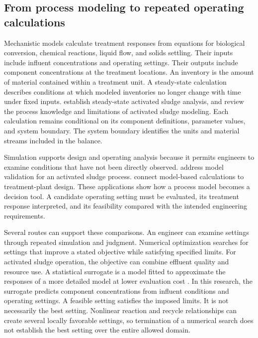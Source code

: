 \subsection{From process modeling to repeated operating calculations}

Mechanistic models calculate treatment responses from equations for biological conversion, chemical reactions, liquid flow, and solids settling. Their inputs include influent concentrations and operating settings. Their outputs include component concentrations at the treatment locations. An inventory is the amount of material contained within a treatment unit. A steady-state calculation describes conditions at which modeled inventories no longer change with time under fixed inputs. \citet{Marais1976} establish steady-state activated sludge analysis, and \citet{Hauduc2013} review the process knowledge and limitations of activated sludge modeling. Each calculation remains conditional on its component definitions, parameter values, and system boundary. The system boundary identifies the units and material streams included in the balance.

Simulation supports design and operating analysis because it permits engineers to examine conditions that have not been directly observed. \citet{Calise2020} address model validation for an activated sludge process. \citet{Rivas2008} connect model-based calculations to treatment-plant design. These applications show how a process model becomes a decision tool. A candidate operating setting must be evaluated, its treatment response interpreted, and its feasibility compared with the intended engineering requirements.

Several routes can support these comparisons. An engineer can examine settings through repeated simulation and judgment. Numerical optimization searches for settings that improve a stated objective while satisfying specified limits. For activated sludge operation, the objective can combine effluent quality and resource use. A statistical surrogate is a model fitted to approximate the responses of a more detailed model at lower evaluation cost \citep{BhosekarIerapetritou2018,McBride2019}. In this research, the surrogate predicts component concentrations from influent conditions and operating settings. A feasible setting satisfies the imposed limits. It is not necessarily the best setting. Nonlinear reaction and recycle relationships can create several locally favorable settings, so termination of a numerical search does not establish the best setting over the entire allowed domain.


